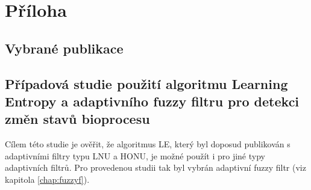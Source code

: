 \documentclass[11pt,twoside,openright]{report}
\begin{document}
\chapter*{Příloha}
\begin{appendices}
\section{Vybrané publikace}




\section{Případová studie použití algoritmu Learning Entropy a ad\-aptivního fuzzy filtru pro detekci změn stavů bioprocesu} \label{chap:LE_fuzzy}
Cílem této studie je ověřit, že algoritmus LE, který byl doposud publikován s adaptivními filtry typu LNU a HONU, je možné použít i pro jiné typy adaptivních filtrů. Pro provedenou studii tak byl vybrán adaptivní fuzzy filtr (viz kapitola \ref{chap:fuzzyf}).

\end{appendices}
\end{document}
